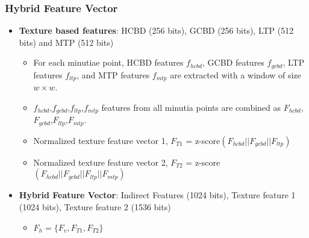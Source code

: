 \subsubsection{Hybrid Feature Vector}
\begin{frame}[t]{\subsubsecname}
	\topline
    \begin{itemize}
    	\item \textcolor{navy_theme}{\textbf{Texture based features}: HCBD (256 bits), GCBD (256
		bits), LTP (512 bits) and MTP (512 bits)}
    	\vspace{0.5em}
    	\begin{itemize}
			\setlength\itemsep{0.5em}
			\item For each minutiae point, HCBD features $f_{hcbd}$, GCBD features $f_{gcbd}$, LTP features
			$f_{ltp}$, and MTP features $f_{mtp}$ are extracted with a window of
			size $w \times w$.
			\item $f_{hcbd}$,$f_{gcbd}$,$f_{ltp}$,$f_{mtp}$ features from all minutia points
			are combined as $F_{hcbd}$,$F_{gcbd}$,$F_{ltp}$,$F_{mtp}$.
			\item Normalized texture feature vector 1, $F_{T1}$ = z-score$(F_{hcbd}||F_{gcbd} ||F_{ltp})$
			\item Normalized texture feature vector 2, $F_{T2}$ = z-score$(F_{hcbd}|| F_{gcbd} ||F_{ltp}||F_{mtp})$
		\end{itemize}
		\vspace{1em}
		\item \textcolor{navy_theme}{\textbf{Hybrid Feature Vector}: Indirect Features (1024 bits), Texture feature 1 (1024 bits), Texture  feature 2 (1536 bits)}
		\vspace{0.5em}
    	\begin{itemize}
			\item $F_{h} = \{ F_v, F_{T1}, F_{T2}\}$
		\end{itemize}
	\end{itemize}
\end{frame}

